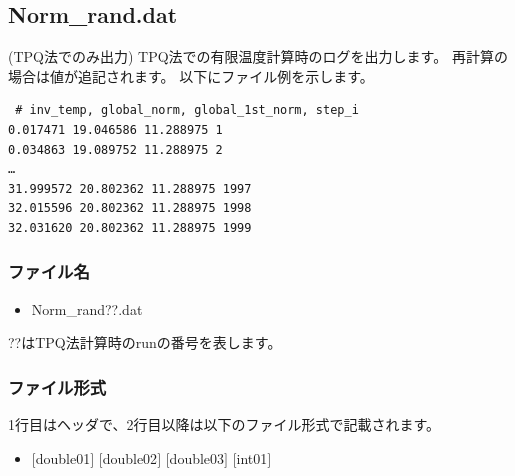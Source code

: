 \newpage
\subsection{Norm\_rand.dat}
\label{Subsec:normrand}
(TPQ法でのみ出力) TPQ法での有限温度計算時のログを出力します。
再計算の場合は値が追記されます。
以下にファイル例を示します。\\
\begin{minipage}{12.5cm}
\begin{screen}
\begin{verbatim}
 # inv_temp, global_norm, global_1st_norm, step_i 
0.017471 19.046586 11.288975 1
0.034863 19.089752 11.288975 2
…
31.999572 20.802362 11.288975 1997
32.015596 20.802362 11.288975 1998
32.031620 20.802362 11.288975 1999
\end{verbatim}
\end{screen}
\end{minipage}

\subsubsection{ファイル名}
\begin{itemize}
   \item Norm\_rand??.dat
  \end{itemize}
  ??はTPQ法計算時のrunの番号を表します。


\subsubsection{ファイル形式}
1行目はヘッダで、2行目以降は以下のファイル形式で記載されます。
 \begin{itemize}
   \item $[$double01$]$ $[$double02$]$ $[$double03$]$ $[$int01$]$
  \end{itemize}
